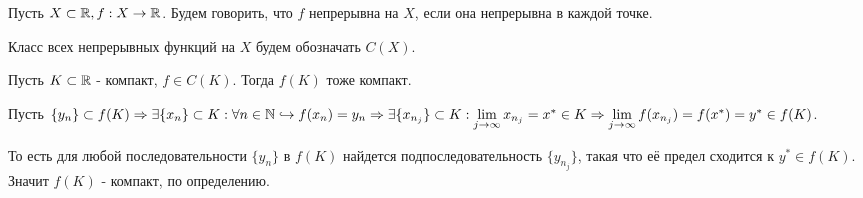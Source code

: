 \Def Пусть $X \subset \mathbb{R}, f: X \to \mathbb{R}$. Будем говорить, что $f$ непрерывна на $X$, если она непрерывна в каждой точке.

\Def Класс всех непрерывных функций на $X$ будем обозначать $C(X)$.

\Th Пусть $K \subset \mathbb{R}$ - компакт, $f \in C(K)$. Тогда $f(K)$ тоже компакт.

\Proof

Пусть $\{y_n\} \subset f(K) \Rightarrow \exists \{x_n\} \subset K: \forall n \in \mathbb{N} \hookrightarrow f(x_n) = y_n \Rightarrow \exists \{x_{n_j}\} \subset K: \lim\limits_{j \to \infty} x_{n_j} = x^* \in K \Rightarrow \lim\limits_{j \to \infty} f(x_{n_j}) = f(x^*) = y^* \in f(K)$.

То есть для любой последовательности $\{y_n\}$ в $f(K)$ найдется подпоследовательность $\{y_{n_j}\}$, такая что её предел сходится к $y^* \in f(K)$. Значит $f(K)$ - компакт, по определению.

\Endproof
